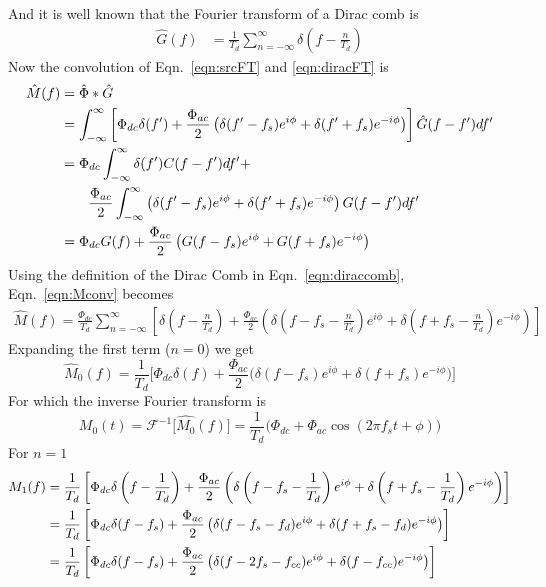 And it is well known that the Fourier transform of a Dirac comb is
\begin{align}
\label{eqn:diracFT}
\hat{G}(f)
&=\frac{1}{T_d}\sum_{n=-\infty}^{\infty} \delta\left( f - \frac{n}{T_d}\right)
\end{align}
\noindent
Now the convolution of Eqn.~\ref{eqn:srcFT} and \ref{eqn:diracFT} is
\begin{align}
\label{eqn:Mconv}
\hat{M}(f)
&=\hat{\Phi}*\hat{G}\\
&=\int_{-\infty}^{\infty} \left[\Phi_{dc} \delta(f') + \frac{\Phi_{ac}}{2} \left( \delta(f'-f_s)e^{i\phi} + \delta(f'+f_s)e^{-i\phi}\right)\right] \hat{G}(f-f')df' \notag \\
&=\Phi_{dc} \int_{-\infty}^{\infty} \delta(f') C(f-f') df' + \\
& \qquad \frac{\Phi_{ac}}{2} \int_{-\infty}^{\infty} \left( \delta(f'-f_s)e^{i\phi}+\delta(f'+f_s)e^{-i\phi}\right) G(f-f') df' \notag \\
&=\Phi_{dc} G(f)+ \frac{\Phi_{ac}}{2}\left(G(f-f_s)e^{i\phi}+G(f+f_s)e^{-i\phi}\right)
\end{align}
Using the definition of the Dirac Comb in Eqn.~\ref{eqn:diraccomb}, Eqn.~\ref{eqn:Mconv} becomes
\begin{align}
\hat{M}(f)=\frac{\Phi_{dc}}{T_{d}} \sum_{n=-\infty}^{\infty} \left[\delta \left( f - \frac{n}{T_{d}}\right)+\frac{\Phi_{ac}}{2} \left(\delta \left(f-f_s-\frac{n}{T_{d}}\right)e^{i\phi} + \delta\left(f+f_s-\frac{n}{T_{d}}\right)e^{-i\phi}\right)\right]
\end{align}
Expanding the first term ($n=0$) we get
\begin{equation}
\hat{M}_0(f)=\frac{1}{T_{d}}\Big[\Phi_{dc}\delta(f)+\frac{\Phi_{ac}}{2}\Big( \delta(f-f_s)e^{i\phi}+\delta(f+f_s)e^{-i\phi}\Big)\Big]
\end{equation}
\noindent
For which the inverse Fourier transform is
\begin{equation}
M_0(t)=\mathcal{F}^{-1}\Big[\hat{M_0}(f)\Big] =\frac{1}{T_{d}}\Big(\Phi_{dc}+\Phi_{ac}\cos(2\pi f_st+\phi)\Big)
\end{equation}
\noindent
For $n=1$
\begin{align}
M_{1}(f)
&=\frac{1}{T_{d}}
\left[\Phi_{dc}\delta\left(f-\frac{1}{T_{d}}\right)+\frac{\Phi_{ac}}{2}\left(\delta\left( f-f_s-\frac{1}{T_{d}}\right)e^{i\phi}+\delta \left(f+f_s-\frac{1}{T_{d}}\right)e^{-i\phi}\right)\right] \notag\\
&=\frac{1}{T_{d}}\left[\Phi_{dc} \delta(f-f_s)+\frac{\Phi_{ac}}{2} \left(\delta(f-f_s-f_d)e^{i\phi}+\delta(f+f_s-f_d)e^{-i\phi}\right)\right]\notag\\
&=\frac{1}{T_{d}}\left[\Phi_{dc} \delta(f-f_s)+\frac{\Phi_{ac}}{2}\left(\delta(f-2f_s-f_{cc})e^{i\phi}+\delta(f-f_{cc})e^{-i\phi}\right)\right]
\end{align}
